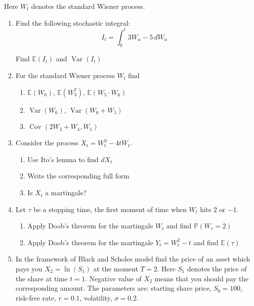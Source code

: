 \documentclass[12pt,a4paper]{article}
\newcommand{\E}{\mathbb{E}}
\renewcommand{\P}{\mathbb{P}}
\DeclareMathOperator{\Cov}{Cov}
\DeclareMathOperator{\Var}{Var}
\begin{document}
Here $W_t$ denotes the standard Wiener process.

\begin{enumerate}
\item Find the following stochastic integral:
\[
I_t = \int_0^t 3W_u-5 \, dW_u
\]

Find $\E(I_t)$ and $\Var(I_t)$

\item For the standard Wiener process $W_t$ find 
\begin{enumerate}
\item $\E(W_6)$, $\E(W_3^7)$, $\E(W_5 \cdot W_6)$
\item $\Var(W_6)$, $\Var(W_6+W_5)$
\item $\Cov(2W_3+W_4,W_1)$
\end{enumerate}

\item Consider the process $X_t=W_t^3-4tW_t$.
\begin{enumerate}
\item Use Ito's lemma to find $dX_t$
\item Write the corresponding full form
\item Is $X_t$ a martingale?
\end{enumerate}

\item Let $\tau$ be a stopping time, the first moment of time  when $W_t$ hits $2$ or $-1$.
\begin{enumerate}
\item Apply Doob's theorem for the martingale $W_t$ and find $\P(W_{\tau}=2)$
\item Apply Doob's theorem for the martingale $Y_t=W_t^2-t$ and find $\E(\tau)$
\end{enumerate}

\item In the framework of Black and Scholes model find the price of an asset which pays you  $X_2=\ln(S_1)$ at the moment $T=2$. Here $S_1$ denotes the price of the share at time $t=1$. Negative value of $X_2$ means that you should pay the corresponding amount. The parameters are: starting share price, $S_0=100$, risk-free rate, $r=0.1$, volatility, $\sigma=0.2$.


\end{enumerate}
\end{document}
